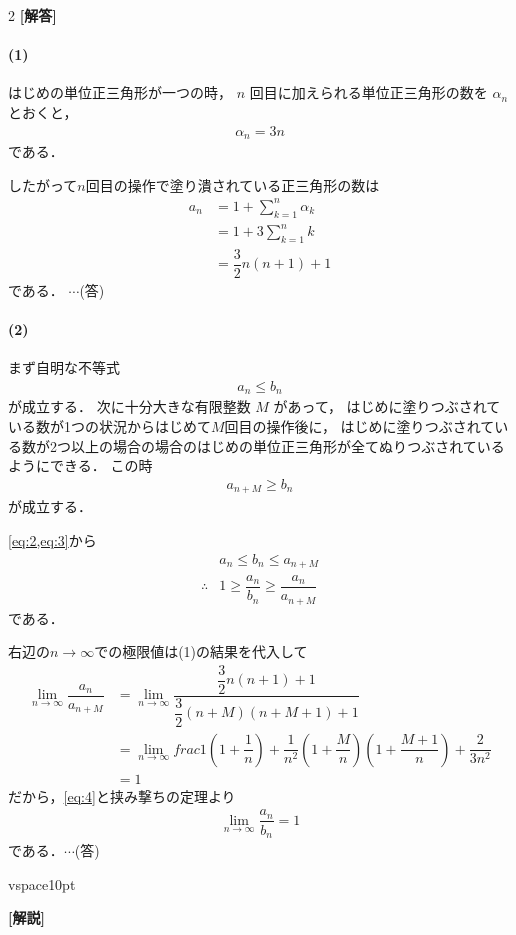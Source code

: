 \documentclass[../../main.tex]{subfiles}
\begin{document}
\setcounter{equation}{0}
\begin{oframed}
  
\end{oframed}
\setlength{\columnseprule}{0.4pt}
\begin{multicols}{2}
  {\bf [解答]}

  \paragraph{(1)}
  はじめの単位正三角形が一つの時，
  $n$ 回目に加えられる単位正三角形の数を $\alpha_n$ とおくと，
  \begin{align}
    \alpha_n = 3n \label{eq:1}
  \end{align}
  である．

  したがって$n$回目の操作で塗り潰されている正三角形の数は
  \begin{align}
    a_n
    & = 1 + \sum_{k=1}^{n} \alpha_{k} \\
    & = 1 + 3 \sum_{k=1}^{n} k        \\
    & = \dfrac{3}{2}n(n+1) + 1
  \end{align}
  である．    $\cdots$(答)

  \paragraph{(2)}
  まず自明な不等式
  \begin{align}
    a_n \le b_n \label{eq:2}
  \end{align}
  が成立する．
  次に十分大きな有限整数 $M$ があって，
  はじめに塗りつぶされている数が1つの状況からはじめて$M$回目の操作後に，
  はじめに塗りつぶされている数が2つ以上の場合の場合のはじめの単位正三角形が全てぬりつぶされているようにできる．
  この時
  \begin{align}
    a_{n+M} \ge b_n \label{eq:3}
  \end{align}
  が成立する．

  \cref{eq:2,eq:3}から
  \begin{align}
    & a_n \le b_n \le a_{n+M}                                           \\
    \therefore
    & 1 \ge \dfrac{a_n}{b_n} \ge \dfrac{a_n}{a_{n+M}} \label{eq:4}
  \end{align}
  である．

  右辺の$n\to\infty$での極限値は(1)の結果を代入して
  \begin{align}
    \lim_{n\to\infty} \dfrac{a_n}{a_{n+M}}
    & = \lim_{n\to\infty} \dfrac{\dfrac{3}{2}n(n+1)+1}{\dfrac{3}{2}(n+M)(n+M+1)+1}                                 \\
    & = \lim_{n\to\infty} frac{1(1+\dfrac{1}{n})+\dfrac{1}{n^2}}{(1+\dfrac{M}{n})(1+\dfrac{M+1}{n})+\dfrac{2}{3n^2}} \\
    & = 1
  \end{align}
  だから，\cref{eq:4}と挟み撃ちの定理より
  \begin{align}
    \lim_{n\to\infty} \dfrac{a_n}{b_n} = 1
  \end{align}
  である．$\cdots$(答)

  vspace{10pt}

  {\bf [解説]}

  \newpage
\end{multicols}
\end{document}
